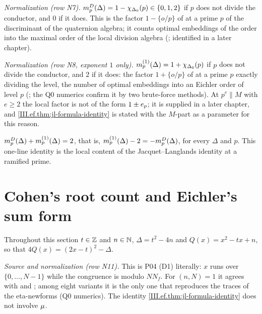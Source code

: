 \begin{definition}
\end{definition}
\noindent \emph{Normalization (row N7).} $m^{D}_p(\Delta)=1-\chi_{\Delta_0}(p)\in\{0,1,2\}$ if $p$ does not divide the conductor, and $0$ if it does. This is
the factor $1-\{o/p\}$ of \cite[Prop.~3.1]{Shz} at a prime $p$ of the discriminant of the quaternion algebra; it counts optimal embeddings of the order
into the maximal order of the local division algebra (\cite[30.5.3(b)]{Voi}; identified in a later chapter).

\begin{definition}
\end{definition}
\noindent \emph{Normalization (row N8, exponent $1$ only).} $m^{(1)}_p(\Delta)=1+\chi_{\Delta_0}(p)$ if $p$ does not divide the conductor, and $2$ if it
does: the factor $1+\{o/p\}$ of \cite[Prop.~3.1]{Shz} at a prime $p$ exactly dividing the level, the number of optimal embeddings into an Eichler order
of level $p$ (\cite[30.6.12, 30.6.17]{Voi}; the Q0 numerics confirm it by two brute-force methods). At $p^e\parallel M$ with $e\ge2$ the local factor is not
of the form $1\pm e_p$; it is supplied in a later chapter, and \cref{III.ef.thm:jl-formula-identity} is stated with the $M$-part as a parameter for
this reason.

\begin{remark}\label{rem:ef-local-complement}
$m^{D}_p(\Delta)+m^{(1)}_p(\Delta)=2$, that is, $m^{(1)}_p(\Delta)-2=-m^{D}_p(\Delta)$, for every $\Delta$ and $p$. This one-line identity is the local content of
the Jacquet--Langlands identity at a ramified prime.
\end{remark}

\section{Cohen's root count and Eichler's sum form}\label{sec:ef-cohen}

Throughout this section $t\in\mathbb{Z}$ and $n\in\mathbb{N}$, $\Delta=t^2-4n$ and $Q(x)=x^2-tx+n$, so that $4Q(x)=(2x-t)^2-\Delta$.

\begin{definition}
\end{definition}
\noindent \emph{Source and normalization (row N11).} This is P04 (D1) literally: $x$ runs over $\{0,\dots,N-1\}$ while the congruence is modulo
$NN_f$. For $(n,N)=1$ it agrees with \cite[(4.7)--(4.8), Thm.~4.9]{Ass} and \cite[Thm.~12.4.11]{CoSt}; among eight variants it is the only one that
reproduces the traces of the eta-newforms (Q0 numerics). The identity \cref{III.ef.thm:jl-formula-identity} does not involve $\mu$.

